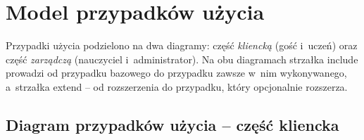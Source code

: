 \chapter{Model przypadków użycia}

Przypadki użycia podzielono na dwa diagramy: część \emph{kliencką} (gość i~uczeń) oraz
część \emph{zarządczą} (nauczyciel i~administrator). Na obu diagramach strzałka
\guillemotleft include\guillemotright{} prowadzi od przypadku bazowego do przypadku zawsze
w~nim wykonywanego, a~strzałka \guillemotleft extend\guillemotright{} -- od rozszerzenia
do przypadku, który opcjonalnie rozszerza.

\section{Diagram przypadków użycia -- część kliencka}

